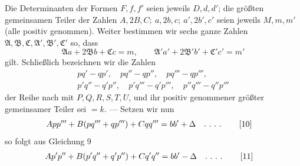 Die Determinanten der Formen $F,f,f'$ seien jeweils $D,d,d'$; die größten gemeinsamen Teiler der Zahlen $A,2B,C;\ a,2b,c;\ a',2b',c'$ seien jeweils $M,m,m'$ (alle positiv genommen). Weiter bestimmen wir sechs ganze Zahlen $\mathfrak{A},\mathfrak{B},\mathfrak{C},\mathfrak{A}',\mathfrak{B}',\mathfrak{C}'$ so, dass
\[
\mathfrak{A}a+2\mathfrak{B}b+\mathfrak{C}c=m,\qquad
\mathfrak{A}'a'+2\mathfrak{B}'b'+\mathfrak{C}'c'=m'
\]
gilt. Schließlich bezeichnen wir die Zahlen
\[
\begin{gathered}pq'-qp',\quad pq''-qp'',\quad pq'''-qp''',\\p'q''-q'p'',\quad p'q'''-q'p''',\quad p''q'''-q''p'''\end{gathered}
\]
der Reihe nach mit $P,Q,R,S,T,U$, und ihr positiv genommener größter gemeinsamer Teiler sei $=k$. --- Setzen wir nun
\begin{align*}
App'''+B(pq'''+qp''')+Cqq'''&=bb'+\Delta\quad\ldotp\,\ldotp\,\ldotp\,\ldotp\tag*{[10]}
\end{align*}
so folgt aus Gleichung 9
\begin{align*}
Ap'p''+B(p'q''+q'p'')+Cq'q''&=bb'-\Delta\quad\ldotp\,\ldotp\,\ldotp\,\ldotp\tag*{[11]}
\end{align*}

